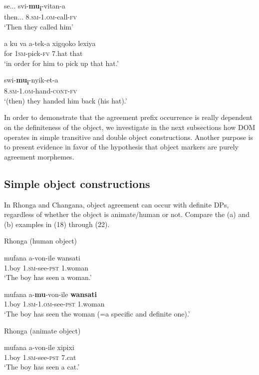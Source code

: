 \documentclass[output=paper]{langsci/langscibook}
\begin{document}
\ea
\gll se...         svi-\textbf{mu}\textbf{\textup{\textsubscript{i}}}{}-vitan-a\\
     then...     8.\textsc{sm-1.om}{}-call-\textsc{fv}\\
\glt ‘Then they called him’
\z

\ea
\gll a ku va       a-tek-a              xigqoko       lexiya\\
     for             1\textsc{sm}{}-pick-\textsc{fv}      7.hat             that\\
\glt ‘in order for him to pick up that hat.’
\z

\ea
\gll swi-\textbf{mu}\textbf{\textup{\textsubscript{i}}}{}-nyik-et-a\\
     8.\textsc{sm}{}-1.\textsc{om}{}-hand-\textsc{cont}{}-\textsc{fv}\\
\glt ‘(then) they handed him back (his hat).’
\z

{In order to demonstrate that the agreement prefix occurrence is really dependent on the definiteness of the object, we investigate in the next subsections how DOM operates in simple transitive and double object constructions. Another purpose is to present evidence in favor of the hypothesis that object markers are purely agreement morphemes.}
\subsection{Simple object constructions}

In Rhonga and Changana, object agreement can occur with definite DPs, regardless of whether the object is animate/human or not. Compare the (a) and (b) examples in (18) through (22).

{Rhonga (human object)}

\ea
\gll mufana         a-von-ile                  wansati\\
     1.boy           1.\textsc{sm}{}-see-\textsc{pst}            1.woman\\
\glt ‘The boy has seen a woman.’
\z

\ea
\gll mufana    a-\textbf{mu}{}-von-ile             \textbf{wansati}\\
     1.boy     1\textsc{.sm-1.om}{}-see-\textsc{pst}     1.woman\\
\glt ‘The boy has seen the woman (=a specific and definite one).’
\z

{Rhonga (animate object)}

\ea
\gll mufana       a-von-ile                    xipixi\\
     1.boy          1.\textsc{sm}{}-see-\textsc{pst }             7.cat\\
\glt ‘The boy has seen a cat.’
\z
\end{document}
